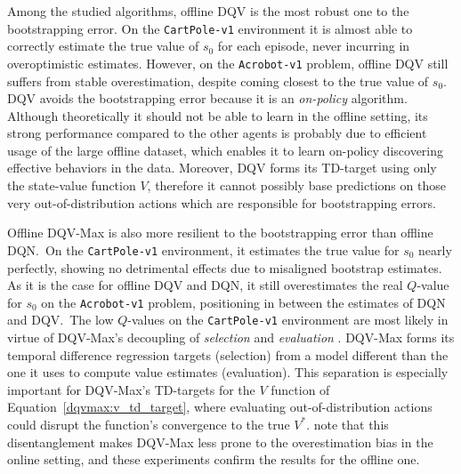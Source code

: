 Among the studied algorithms, offline DQV is the most robust one to
the bootstrapping error. On the \texttt{CartPole-v1} environment it is
almost able to correctly estimate the true value of $s_0$ for each
episode, never incurring in overoptimistic estimates. However, on the
\texttt{Acrobot-v1} problem, offline DQV still suffers from stable
overestimation, despite coming closest to the true value of $s_0$.
DQV avoids the bootstrapping error because it is an \textit{on-policy}
algorithm. Although theoretically it should not be able to learn in
the offline setting, its strong
performance compared to the other agents is probably due to efficient
usage of the large offline dataset, which enables it to learn on-policy
discovering effective behaviors in the data. Moreover, DQV forms its
TD-target using only the state-value function $V$, therefore it cannot
possibly base predictions on those very out-of-distribution actions
which are responsible for bootstrapping errors.

Offline DQV-Max is also more resilient to the bootstrapping error than
offline DQN.\ On the \texttt{CartPole-v1} environment, it estimates
the true value for $s_0$ nearly perfectly, showing no detrimental
effects due to misaligned bootstrap estimates. As it is the case for
offline DQV and DQN, it still overestimates the real $Q$-value for
$s_0$ on the \texttt{Acrobot-v1} problem, positioning in between the
estimates of DQN and DQV.\ The low $Q$-values on the
\texttt{CartPole-v1} environment are most likely in virtue of
DQV-Max's decoupling of \textit{selection} and \textit{evaluation}
\citep{van2016deep}. DQV-Max forms its temporal difference regression
targets (selection) from a model different than the one it uses to
compute value estimates (evaluation). This separation is especially
important for DQV-Max's TD-targets for the $V$ function of
Equation~\ref{dqvmax:v_td_target}, where evaluating
out-of-distribution actions could disrupt the function's
convergence to the true $V^*$. \citet{sabatelli2020deep} note that
this disentanglement makes DQV-Max less prone to the overestimation
bias in the online setting, and these experiments confirm the results
for the offline one.

